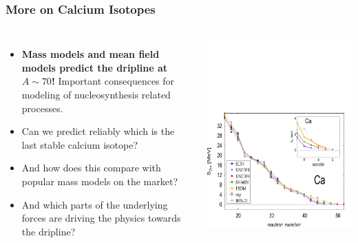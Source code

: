 \documentclass[compress]{beamer}
\begin{document}
\frame
{
  \frametitle{More on Calcium Isotopes}
      \begin{footnotesize}
     \begin{columns}
      \column{5.0cm}
\begin{itemize}
\item {\bf Mass models and mean field models predict the dripline at $A\sim 70$!} Important consequences for modeling of nucleosynthesis related processes.
\item Can we predict reliably which is the last stable calcium isotope? 
\item And how
does this compare with popular mass models on the market? 
\item And which parts of the underlying forces
are driving the physics towards the dripline?
\end{itemize}
\column{6cm}
\vspace{-3cm}
      \begin{center}
	\includegraphics[width=1.15\textwidth]{Figures/witeknatureca.pdf}
      \end{center}
\end{columns}
      \end{footnotesize}
}
\end{document}
